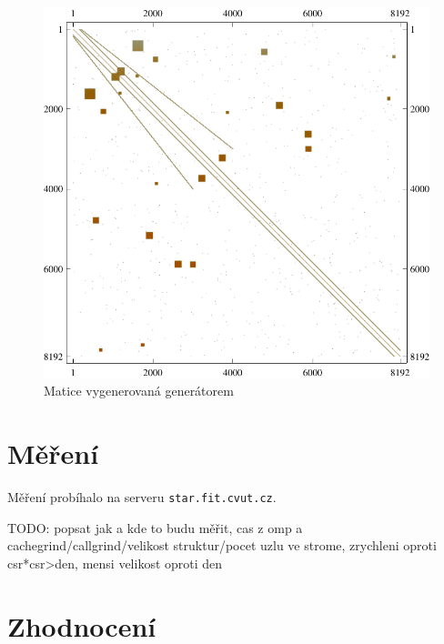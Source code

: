 
\begin{figure}[htb]
	\includegraphics[width=1.0\textwidth]{./images/generated_matrix}
	\caption{Matice vygenerovaná generátorem}
	\label{fig:generatedMtx}
\end{figure}





\section{Měření}

Měření probíhalo na serveru \texttt{star.fit.cvut.cz}.

TODO: popsat jak a kde to budu měřit, cas z omp a cachegrind/callgrind/velikost struktur/pocet uzlu ve strome, zrychleni oproti csr*csr>den, mensi velikost oproti den

\section{Zhodnocení}

